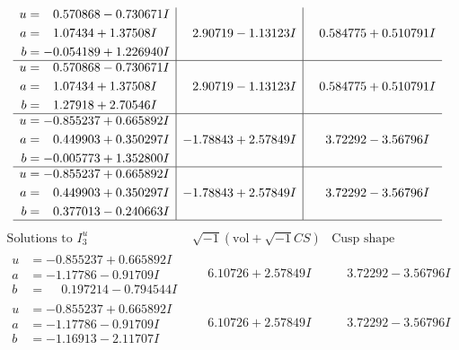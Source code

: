 \documentclass[1p]{elsarticle_modified}
\theoremstyle{definition}
\newcommand{\I}{\sqrt{-1}}
\begin{document}
$$\begin{array}{c|c|c}
\begin{aligned}
u &= \phantom{-}0.570868 - 0.730671 I \\
a &= \phantom{-}1.07434 + 1.37508 I \\
b &= -0.054189 + 1.226940 I\end{aligned}
 & \phantom{-}2.90719 - 1.13123 I & \phantom{-}0.584775 + 0.510791 I \\ \hline\begin{aligned}
u &= \phantom{-}0.570868 - 0.730671 I \\
a &= \phantom{-}1.07434 + 1.37508 I \\
b &= \phantom{-}1.27918 + 2.70546 I\end{aligned}
 & \phantom{-}2.90719 - 1.13123 I & \phantom{-}0.584775 + 0.510791 I \\ \hline\begin{aligned}
u &= -0.855237 + 0.665892 I \\
a &= \phantom{-}0.449903 + 0.350297 I \\
b &= -0.005773 + 1.352800 I\end{aligned}
 & -1.78843 + 2.57849 I & \phantom{-}3.72292 - 3.56796 I \\ \hline\begin{aligned}
u &= -0.855237 + 0.665892 I \\
a &= \phantom{-}0.449903 + 0.350297 I \\
b &= \phantom{-}0.377013 - 0.240663 I\end{aligned}
 & -1.78843 + 2.57849 I & \phantom{-}3.72292 - 3.56796 I\\
 \hline 
 \end{array}$$\newpage$$\begin{array}{c|c|c}  
\text{Solutions to }I^u_{3}& \I (\text{vol} + \sqrt{-1}CS) & \text{Cusp shape}\\
 \hline 
\begin{aligned}
u &= -0.855237 + 0.665892 I \\
a &= -1.17786 - 0.91709 I \\
b &= \phantom{-}0.197214 - 0.794544 I\end{aligned}
 & \phantom{-}6.10726 + 2.57849 I & \phantom{-}3.72292 - 3.56796 I \\ \hline\begin{aligned}
u &= -0.855237 + 0.665892 I \\
a &= -1.17786 - 0.91709 I \\
b &= -1.16913 - 2.11707 I\end{aligned}
 & \phantom{-}6.10726 + 2.57849 I & \phantom{-}3.72292 - 3.56796 I \\ \hline\begin{aligned}

\end{aligned}
\end{array}$$
\end{document}
